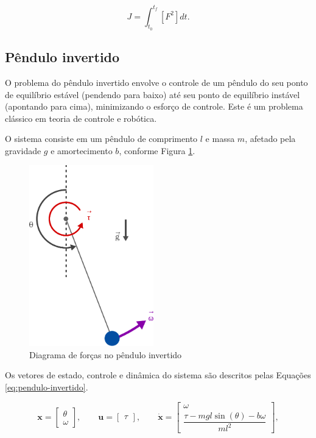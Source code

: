 \begin{equation}
    J = \int_{t_0}^{t_f} \left[ F^2 \right] dt.
    \label{eq:movimento-simples-J}
\end{equation}


\subsection{Pêndulo invertido}
\label{subsec:pendulo-invertido}

O problema do pêndulo invertido envolve o controle de um pêndulo do seu ponto de equilíbrio estável (pendendo para baixo) até seu ponto de equilíbrio instável (apontando para cima), minimizando o esforço de controle. Este é um problema clássico em teoria de controle e robótica.

O sistema consiste em um pêndulo de comprimento $l$ e massa $m$, afetado pela gravidade $g$ e amortecimento $b$, conforme Figura \ref{fig:pendulo-invertido}.

\begin{figure}[H]
    \centering
    \includegraphics[width=0.48\textwidth]{Cap3/figuras/pendulo-invertido.pdf}
    \caption{Diagrama de forças no pêndulo invertido}
    \label{fig:pendulo-invertido}
\end{figure}

Os vetores de estado, controle e dinâmica do sistema são descritos pelas Equações \ref{eq:pendulo-invertido}.

\begin{equation}
    \mathbf{x} = \begin{bmatrix}
        \theta \\
        \omega
    \end{bmatrix},
    \qquad
    \mathbf{u} = \begin{bmatrix}
        \tau
    \end{bmatrix},
    \qquad
    \dot{\mathbf{x}} = \begin{bmatrix}
        \omega \\
        \dfrac{\tau - mgl\sin(\theta) - b\omega}{ml^2}
    \end{bmatrix},
    \label{eq:pendulo-invertido}
\end{equation}

